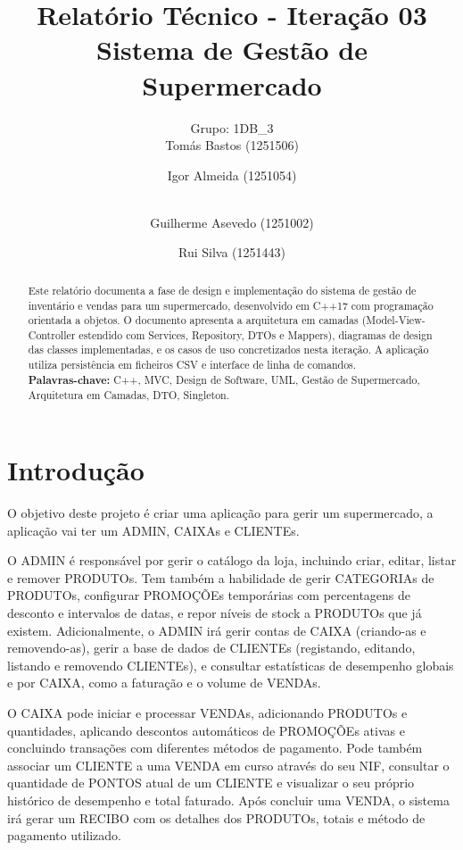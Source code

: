 \documentclass[a4paper]{llncs}
\begin{document}
\mainmatter

\title{Relatório Técnico - Iteração 03\\Sistema de Gestão de Supermercado}

\author{Grupo: 1DB\_3 \\
Tomás Bastos (1251506) \and Igor Almeida (1251054) \and \\
Guilherme Asevedo (1251002) \and Rui Silva (1251443)}

\maketitle

\begin{abstract}
Este relatório documenta a fase de design e implementação do sistema de gestão de inventário e vendas para um supermercado, desenvolvido em C++17 com programação orientada a objetos. O documento apresenta a arquitetura em camadas (Model-View-Controller estendido com Services, Repository, DTOs e Mappers), diagramas de design das classes implementadas, e os casos de uso concretizados nesta iteração. A aplicação utiliza persistência em ficheiros CSV e interface de linha de comandos.
\\
\textbf{Palavras-chave:} C++, MVC, Design de Software, UML, Gestão de Supermercado, Arquitetura em Camadas, DTO, Singleton.
\end{abstract}

\section{Introdução}
O objetivo deste projeto é criar uma aplicação para gerir um supermercado, a aplicação vai ter um ADMIN, CAIXAs e CLIENTEs.

O ADMIN é responsável por gerir o catálogo da loja, incluindo criar, editar, listar e remover PRODUTOs. Tem também a habilidade de gerir CATEGORIAs de PRODUTOs, configurar PROMOÇÕEs temporárias com percentagens de desconto e intervalos de datas, e repor níveis de stock a PRODUTOs que já existem. Adicionalmente, o ADMIN irá gerir contas de CAIXA (criando-as e removendo-as), gerir a base de dados de CLIENTEs (registando, editando, listando e removendo CLIENTEs), e consultar estatísticas de desempenho globais e por CAIXA, como a faturação e o volume de VENDAs.

O CAIXA pode iniciar e processar VENDAs, adicionando PRODUTOs e quantidades, aplicando descontos automáticos de PROMOÇÕEs ativas e concluindo transações com diferentes métodos de pagamento. Pode também associar um CLIENTE a uma VENDA em curso através do seu NIF, consultar o quantidade de PONTOS atual de um CLIENTE e visualizar o seu próprio histórico de desempenho e total faturado. Após concluir uma VENDA, o sistema irá gerar um RECIBO com os detalhes dos PRODUTOs, totais e método de pagamento utilizado.
\end{document}
